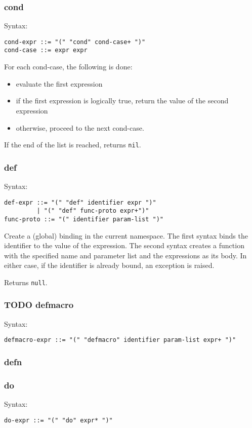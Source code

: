 \documentclass[11pt]{article}
\begin{document}
\subsubsection{cond}
\label{sec:orgcf965a5}
Syntax:
\begin{verbatim}
cond-expr ::= "(" "cond" cond-case+ ")"
cond-case ::= expr expr
\end{verbatim}

For each cond-case, the following is done:
\begin{itemize}
\item evaluate the first expression
\item if the first expression is logically true, return the value of the second
expression
\item otherwise, proceed to the next cond-case.
\end{itemize}

If the end of the list is reached, returns \texttt{nil}.
\subsubsection{def}
\label{sec:orgd2a8583}
Syntax:
\begin{verbatim}
def-expr ::= "(" "def" identifier expr ")"
         | "(" "def" func-proto expr+")"
func-proto ::= "(" identifier param-list ")"
\end{verbatim}

Create a (global) binding in the current namespace. The first syntax binds the
identifier to the value of the expression. The second syntax creates a function
with the specified name and parameter list and the expressions as its body. In
either case, if the identifier is already bound, an exception is raised.

Returns \texttt{null}.

\subsubsection{{\bfseries\sffamily TODO} defmacro}
\label{sec:orgcbb20c2}
Syntax:
\begin{verbatim}
defmacro-expr ::= "(" "defmacro" identifier param-list expr+ ")"
\end{verbatim}

\subsubsection{defn}
\label{sec:org7c526d7}
\subsubsection{do}
\label{sec:org04e81c1}
Syntax:
\begin{verbatim}
do-expr ::= "(" "do" expr* ")"
\end{verbatim}
\end{document}
